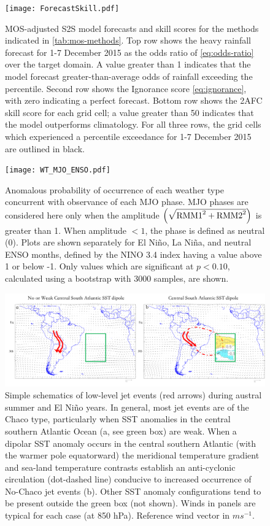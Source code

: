 \documentclass[twocol]{ametsoc}
\begin{document}
\begin{figure}
	\noindent\texttt{[image: ForecastSkill.pdf]}
	\caption{
		MOS-adjusted S2S model forecasts and skill scores for the methods indicated in \cref{tab:mos-methods}.
		Top row shows the heavy rainfall forecast for 1-7 December 2015 as the odds ratio of \cref{eq:odds-ratio} over the target domain.
		A value greater than 1 indicates that the model forecast greater-than-average odds of rainfall exceeding the  percentile.
        Second row shows the Ignorance score \cref{eq:ignorance}, with zero indicating a perfect forecast.
		Bottom row shows the 2AFC skill score for each grid cell; a value greater than 50 indicates that the model outperforms climatology.
		For all three rows, the grid cells which experienced a  percentile exceedance for 1-7 December 2015 are outlined in black.
	}
  \label{fig:subs-prob-fcst}
\end{figure}

\begin{figure}
	\noindent\texttt{[image: WT\_MJO\_ENSO.pdf]}
	\caption{
		Anomalous probability of occurrence of each weather type concurrent with observance of each MJO phase.
		MJO phases are considered here only when the amplitude $\qty(\sqrt{\text{RMM1}^2 + \text{RMM2}^2})$ is greater than 1.
		When amplitude $< 1$, the phase is defined as neutral (0).
		Plots are shown separately for El Ni\~no, La Ni\~na, and neutral ENSO months, defined by the NINO 3.4 index having a value above 1 or below -1.
		Only values which are significant at $p<0.10$, calculated using a bootstrap with 3000 samples, are shown.
	}
  \label{fig:wt-mjo-enso}
\end{figure}

\begin{figure}
	\noindent\includegraphics[width=6.4in]{ChacoNoChacojet.pdf}
	\caption{
		Simple schematics of low-level jet events (red arrows) during austral summer and El Ni\~no years.
		In general, most jet events are of the Chaco type, particularly when SST anomalies in the central southern Atlantic Ocean (a, see green box) are weak.
		When a dipolar SST anomaly occurs in the central southern Atlantic (with the warmer pole equatorward) the meridional temperature gradient and sea-land temperature contrasts establish an anti-cyclonic circulation (dot-dashed line) conducive to increased occurrence of No-Chaco jet events (b).
		Other SST anomaly configurations tend to be present outside the green box (not shown).
		Winds in panels are typical for each case (at 850 hPa).
		Reference wind vector in $m s^{-1}$.
	}
  \label{fig:chaco-nochaco}
\end{figure}
\end{document}
